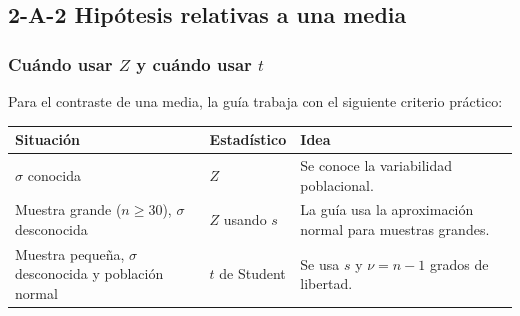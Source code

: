 \documentclass[11pt,a4paper]{article}
\begin{document}
\subsection{2-A-2 Hipótesis relativas a una media}

\subsubsection{\texorpdfstring{Cuándo usar $Z$ y cuándo usar $t$}{Cuándo usar Z y cuándo usar t}}

Para el contraste de una media, la guía trabaja con el siguiente criterio práctico:

\begin{table}[H]
\centering
\small
\begin{tabularx}{\textwidth}{p{3.2cm}p{2.6cm}X}
\toprule
Situación & Estadístico & Idea \\
\midrule
$\sigma$ conocida & $Z$ & Se conoce la variabilidad poblacional.\\
Muestra grande ($n\ge30$), $\sigma$ desconocida & $Z$ usando $s$ & La guía usa la aproximación normal para muestras grandes.\\
Muestra pequeña, $\sigma$ desconocida y población normal & $t$ de Student & Se usa $s$ y $\nu=n-1$ grados de libertad.\\
\bottomrule
\end{tabularx}
\end{table}
\end{document}
